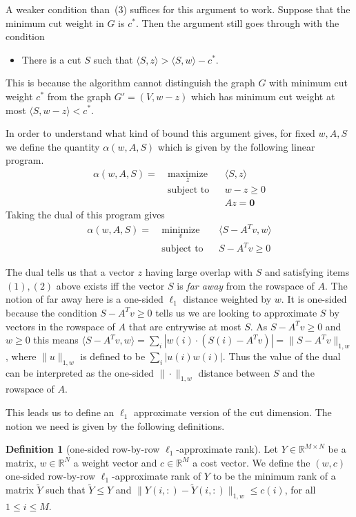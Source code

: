 \documentclass[10pt,a4paper]{article}
\newcommand{\R}{\mathbb{R}}
\newcommand{\zero}{\mathbf{0}}
\newcommand{\braket}[2]{\langle#1, #2\rangle}
\newcommand{\1}{\mathbf{1}}
\theoremstyle{definition}
\newtheorem{definition}[theorem]{Definition}
\begin{document}
A weaker condition than~(3) suffices for this argument to work.  Suppose that the minimum cut weight in $G$ is $c^*$.
Then the argument still goes through with the condition
\begin{itemize}
  \item[3'.] There is a cut $S$ such that $\braket{S}{z} > \braket{S}{w}-c^*$.
\end{itemize}
This is because the algorithm cannot distinguish the graph $G$ with minimum cut weight $c^*$ from the graph $G' = (V,w-z)$
which has minimum cut weight at most $\braket{S}{w-z} < c^*$.

In order to understand what kind of bound this argument gives, for fixed $w,A,S$ we define the quantity $\alpha(w,A,S)$
which is given by the following linear program.
\begin{equation*}
\begin{aligned}
\alpha(w,A,S) =\  & \underset{z}{\text{maximize}}
& & \braket{S}{z} \\
& \text{subject to}
& & w-z \ge 0 \\
& & & Az = \zero
\end{aligned}
\end{equation*}
Taking the dual of this program gives
\begin{equation*}
\begin{aligned}
\alpha(w,A,S) =\  & \underset{v}{\text{minimize}}
& & \braket{S - A^Tv}{w} \\
& \text{subject to}
& & S - A^T v \ge 0
\end{aligned}
\end{equation*}

The dual tells us that a vector $z$ having large overlap with $S$ and satisfying items $(1),(2)$ above exists
iff the vector $S$ is \emph{far away} from the rowspace of $A$.  The notion of far away here is a one-sided $\ell_1$ distance
weighted by $w$.  It is one-sided because the condition $S - A^T v \ge 0$ tells us we are looking to approximate $S$ by
vectors in the rowspace of $A$ that are entrywise at most $S$.  As $S - A^T v \ge 0$ and $w \ge 0$ this means
$\braket{S - A^Tv}{w} = \sum_i | w(i) \cdot (S (i)- A^Tv)| = \|S - A^Tv \|_{1,w}$, where
$\|u\|_{1,w}$ is defined to be $\sum_i |u(i)w(i)|$.  Thus the value of the dual can be interpreted as the one-sided $\| \cdot \|_{1,w}$ distance
between $S$ and the rowspace of $A$.

This leads us to define an $\ell_1$ approximate version of the cut dimension.  The notion
we need is given by the following definitions.
%
\begin{definition}[one-sided row-by-row $\ell_1$-approximate rank]
Let $Y \in \R^{M \times N}$ be a matrix, $w \in \R^N$ a weight vector and
$c \in \R^M$ a cost vector.  We define the $(w,c)$ one-sided row-by-row $\ell_1$-approximate rank of $Y$ to be
the minimum rank of a matrix $\tilde Y$ such that $\tilde Y \le Y$ and $\| Y(i,:) - \tilde Y(i,:) \|_{1,w} \le c(i)$,
for all $1 \leq i \leq M$.
\end{definition}
\end{document}
